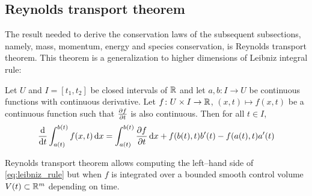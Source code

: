 
\subsection{Reynolds transport theorem}

The result needed to derive the conservation laws of the subsequent subsections, namely, mass, momentum, energy and species conservation, is Reynolds transport theorem. This theorem is a generalization to higher dimensions of Leibniz integral rule:

\begin{theorem}
	Let  $U$ and $I = [t_1, t_2]$ be closed intervals of $\mathbb{R}$ and let $a, b \colon I \rightarrow U$ be continuous functions with continuous derivative. Let $f \colon U \times I \rightarrow \mathbb{R}$, $(x,t) \mapsto f(x,t)$ be a continuous function such that $\pdv{f}{t}$ is also continuous. Then for all $t \in I$,
	\begin{equation} \label{eq:leibniz_rule}
		\frac{\dd}{\dd{t}} \int_{a(t)}^{b(t)} f(x,t) \dd{x} = 
		\int_{a(t)}^{b(t)} \pdv{f}{t}(x,t) \dd{x} + f(b(t),t) b'(t) - f(a(t),t) a'(t)
	\end{equation}
\end{theorem}

\noindent
Reynolds transport theorem allows computing the left--hand side of \eqref{eq:leibniz_rule} but when $f$ is integrated over a bounded smooth control volume $V(t) \subset \mathbb{R}^m$ depending on time.

